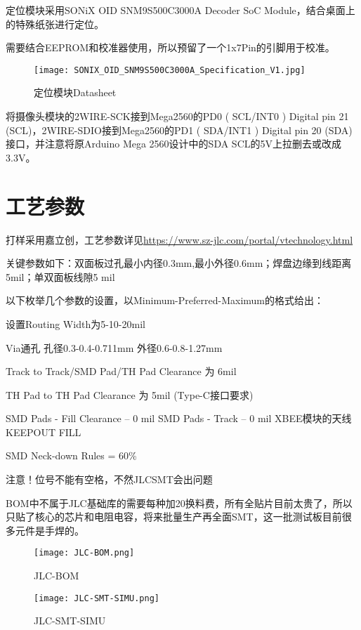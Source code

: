定位模块采用SONiX OID SNM9S500C3000A Decoder SoC Module，结合桌面上的特殊纸张进行定位。

需要结合EEPROM和校准器使用，所以预留了一个1x7Pin的引脚用于校准。

\begin{figure}[htbp]
    \centering
    \texttt{[image: SONIX\_OID\_SNM9S500C3000A\_Specification\_V1.jpg]}
    \caption{定位模块Datasheet}
    \label{fig:Camera}
\end{figure}

将摄像头模块的2WIRE-SCK接到Mega2560的PD0 ( SCL/INT0 ) Digital pin 21 (SCL)，2WIRE-SDIO接到Mega2560的PD1 ( SDA/INT1 ) Digital pin 20 (SDA)接口，并注意将原Arduino Mega 2560设计中的SDA SCL的5V上拉删去或改成3.3V。

\section{工艺参数}

打样采用嘉立创，工艺参数详见\url{https://www.sz-jlc.com/portal/vtechnology.html}

关键参数如下：双面板过孔最小内径0.3mm,最小外径0.6mm；焊盘边缘到线距离 5mil；单双面板线隙5 mil

以下枚举几个参数的设置，以Minimum-Preferred-Maximum的格式给出：

设置Routing Width为5-10-20mil

Via通孔 孔径0.3-0.4-0.711mm 外径0.6-0.8-1.27mm

Track to Track/SMD Pad/TH Pad Clearance 为 6mil

TH Pad to TH Pad Clearance 为 5mil (Type-C接口要求)

SMD Pads - Fill Clearance -- 0 mil   SMD Pads - Track -- 0 mil     XBEE模块的天线KEEPOUT FILL

SMD Neck-down Rules = 60\%

注意！位号不能有空格，不然JLCSMT会出问题

BOM中不属于JLC基础库的需要每种加20换料费，所有全贴片目前太贵了，所以只贴了核心的芯片和电阻电容，将来批量生产再全面SMT，这一批测试板目前很多元件是手焊的。


\begin{figure}[htbp]
    \centering
    \texttt{[image: JLC-BOM.png]}
    \caption{JLC-BOM}
    \label{fig:JLC-BOM}
\end{figure}

\begin{figure}[htbp]
    \centering
    \texttt{[image: JLC-SMT-SIMU.png]}
    \caption{JLC-SMT-SIMU}
    \label{fig:JLC-SMT-SIMU}
\end{figure}


